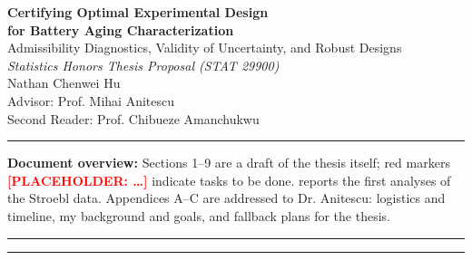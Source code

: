 \documentclass[11pt,letterpaper]{article}
\newcommand{\ph}[1]{\textcolor{red}{\textbf{[PLACEHOLDER: #1]}}}
\begin{document}
\begin{center}
  {\LARGE\bfseries Certifying Optimal Experimental Design\\[0.2em] for Battery Aging Characterization}\\[0.6em]
  {\large Admissibility Diagnostics, Validity of Uncertainty, and Robust Designs}\\[0.8em]
  {\itshape Statistics Honors Thesis Proposal (STAT 29900)}\\[0.4em]
  {\small Nathan Chenwei Hu}\\[0.4em]
  {\small Advisor: Prof. Mihai Anitescu}\\[0.4em]
  {\small Second Reader: Prof. Chibueze Amanchukwu}\\[0.4em]
\end{center}

\begin{abstract}
\noindent Model-based optimal experimental design (OED) promises to make battery aging campaigns, among the slowest and most expensive experiments in battery research, more informative per cell. The first prospective test on real cells, a 279-cell two-stage study by Stroebl et al., gave a split result: OED reduced the uncertainty of a targeted calendar-aging parameter by 28\% but increased the uncertainty of targeted cycle-aging parameters by more than an order of magnitude. This thesis asks whether such outcomes can be predicted in advance and prevented by design. Using public aging datasets, it (i) constructs admissibility diagnostics from pilot data (identifiability, model adequacy, and noise structure) and tests whether they anticipate the observed success and failure; (ii) measures the coverage of bootstrap, Fisher-information, and profile-likelihood intervals at realistic campaign sizes; and (iii) evaluates compromise, Bayesian, and maximin designs that hedge against model error. The intended outcome is a practitioner checklist for when OED can be trusted.
\end{abstract}

\vspace{0.3em}\hrule\vspace{0.4em}
{\small \textbf{Document overview:} Sections 1--9 are a draft of the thesis itself; red markers \ph{\ldots} indicate tasks to be done.  reports the first analyses of the Stroebl data. Appendices A--C are addressed to Dr. Anitescu: logistics and timeline, my background and goals, and fallback plans for the thesis.}
\vspace{0.3em}\hrule
{\small\tableofcontents}
\vspace{0.4em}\hrule\vspace{0.8em}
\end{document}
